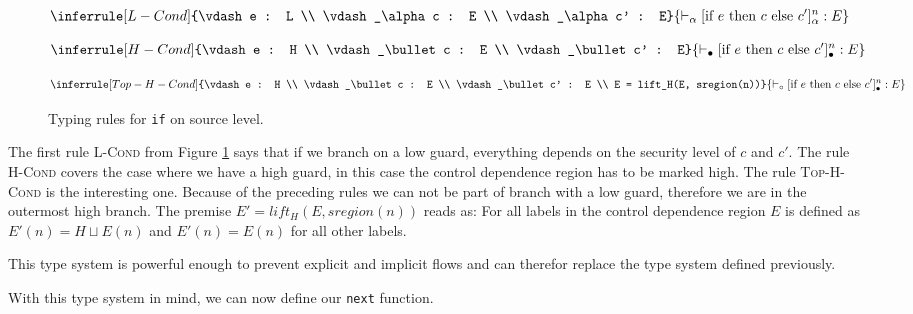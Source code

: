 \documentclass[a4paper,10pt]{llncs}
\begin{document}
\begin{figure}
\begin{minipage}{.5\textwidth}
\begin{align*}
\inferrule[L-Cond]{\vdash e : L \\ \vdash_\alpha c : E \\ \vdash_\alpha c' : E}
{\vdash_\alpha [\text{if} \ e \ \text{then} \ c \ \text{else} \ c']^n_\alpha : E}
\end{align*}
\end{minipage}
\begin{minipage}{.5\textwidth}
\begin{align*}
\inferrule[H-Cond]{\vdash e : H \\ \vdash_\bullet c : E \\ \vdash_\bullet c' : E}
{\vdash_\bullet [\text{if} \ e \ \text{then} \ c \ \text{else} \ c']^n_\bullet : E}
\end{align*}
\end{minipage}

\begin{align*}
\inferrule[Top-H-Cond]{\vdash e : H \\ \vdash_\bullet c : E \\
\vdash_\bullet c' : E \\ E = lift_H(E, sregion(n))}
{\vdash_\circ [\text{if} \ e \ \text{then} \ c \ \text{else} \ c']^n_\bullet : E}
\end{align*}
\caption{Typing rules for \texttt{if} on source level.}
\label{fig:typing-rules-if}
\end{figure}

The first rule \textsc{L-Cond} from Figure \ref{fig:typing-rules-if} says that if we branch on a low
guard, everything depends on the security level of $c$ and $c'$. The rule \textsc{H-Cond} covers the
case where we have a high guard, in this case the control dependence region has to be marked
high. The rule \textsc{Top-H-Cond} is the interesting one. Because of the preceding rules we can not
be part of branch with a low guard, therefore we are in the outermost high branch. The premise
$E' = lift_H(E, sregion(n))$ reads as: For all labels in the control dependence region $E$ is
defined as $E'(n) = H \sqcup E(n)$ and $E'(n) = E(n)$ for all other labels.

This type system is powerful enough to prevent explicit and implicit flows and can therefor
replace the type system defined previously.

With this type system in mind, we can now define our \texttt{next} function.
\end{document}
